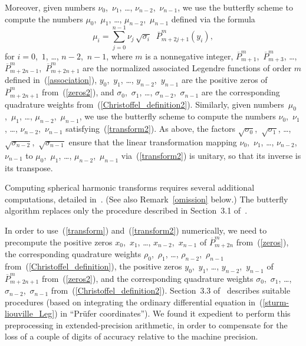 \documentclass[final,3p,times]{elsarticle}
\begin{document}
Moreover, given numbers
$\nu_0$,~$\nu_1$, \dots, $\nu_{n-2}$,~$\nu_{n-1}$,
we use the butterfly scheme to compute the numbers
$\mu_0$,~$\mu_1$, \dots, $\mu_{n-2}$,~$\mu_{n-1}$ defined via the formula
\begin{equation}
\label{transform2}
\mu_i
= \sum_{j=0}^{n-1} \nu_j \, \sqrt{\sigma_i} \;\; \overline{P}^m_{m+2j+1}(y_i),
\end{equation}
for $i = 0$,~$1$, \dots, $n-2$,~$n-1$,
where $m$ is a nonnegative integer,
$\overline{P}^m_{m+1}$,~$\overline{P}^m_{m+3}$, \dots,
$\overline{P}^m_{m+2n-1}$,~$\overline{P}^m_{m+2n+1}$
are the normalized associated Legendre functions of order $m$ defined
in~(\ref{association}),
$y_0$,~$y_1$, \dots, $y_{n-2}$,~$y_{n-1}$ are the positive zeros
of $\overline{P}^m_{m+2n+1}$ from~(\ref{zeros2}),
and $\sigma_0$,~$\sigma_1$, \dots, $\sigma_{n-2}$,~$\sigma_{n-1}$
are the corresponding quadrature weights from~(\ref{Christoffel_definition2}).
Similarly,
given numbers~$\mu_0$,~$\mu_1$, \dots, $\mu_{n-2}$,~$\mu_{n-1}$,
we use the butterfly scheme to compute the numbers
$\nu_0$,~$\nu_1$, \dots, $\nu_{n-2}$,~$\nu_{n-1}$
satisfying~(\ref{transform2}).
As above, the factors $\sqrt{\sigma_0}$,~$\sqrt{\sigma_1}$, \dots,
$\sqrt{\sigma_{n-2}}$,~$\sqrt{\sigma_{n-1}}$ ensure that
the linear transformation mapping
$\nu_0$,~$\nu_1$, \dots, $\nu_{n-2}$,~$\nu_{n-1}$
to $\mu_0$,~$\mu_1$, \dots, $\mu_{n-2}$,~$\mu_{n-1}$
via~(\ref{transform2}) is unitary, so that its inverse is its transpose.

Computing spherical harmonic transforms requires
several additional computations, detailed in~\cite{tygert_sph}.
(See also Remark~\ref{omission} below.)
The butterfly algorithm replaces only the procedure described
in Section~3.1 of~\cite{tygert_sph}.

In order to use~(\ref{transform}) and~(\ref{transform2}) numerically,
we need to precompute the positive zeros
$x_0$,~$x_1$, \dots, $x_{n-2}$,~$x_{n-1}$ 
of $\overline{P}^m_{m+2n}$ from~(\ref{zeros}),
the corresponding quadrature weights
$\rho_0$,~$\rho_1$, \dots, $\rho_{n-2}$,~$\rho_{n-1}$
from~(\ref{Christoffel_definition}),
the positive zeros $y_0$,~$y_1$, \dots, $y_{n-2}$,~$y_{n-1}$
of $\overline{P}^m_{m+2n+1}$ from~(\ref{zeros2}),
and the corresponding quadrature weights
$\sigma_0$,~$\sigma_1$, \dots, $\sigma_{n-2}$,~$\sigma_{n-1}$
from~(\ref{Christoffel_definition2}).
Section~3.3 of~\cite{tygert_sph} describes suitable procedures
(based on integrating the ordinary differential equation
in~(\ref{sturm-liouville_Leg}) in ``Pr\"ufer coordinates'').
We found it expedient to perform this preprocessing in extended-precision
arithmetic, in order to compensate for the loss of a couple of digits
of accuracy relative to the machine precision.
\end{document}
